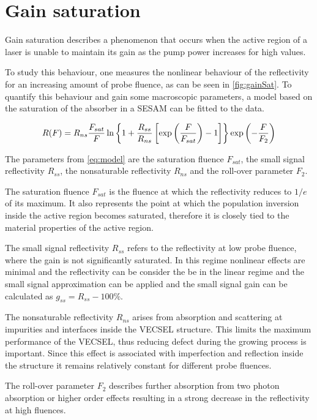 \section{Gain saturation}

Gain saturation describes a phenomenon that occurs when the active region of a laser is unable to maintain its gain as the pump power increases for high values. 

To study this behaviour, one measures the nonlinear behaviour of the reflectivity for an increasing amount of probe fluence, as can be seen in \cref{fig:gainSat}. To quantify this behaviour and gain some macroscopic parameters, a model based on the saturation of the absorber in a SESAM can be fitted to the data. 

\begin{equation}
    \centering
    R(F)=R_{ns} \frac{F_{sat}}{F} \ln\left\{1 + \frac{R_{ss}}{R_{ns}} \left[\exp{ \left(\frac{F}{F_{sat}}\right) } - 1\right]\right\} \exp{\left(-\frac{F}{F_2}\right)}
    \label{eq:model}
\end{equation}

The parameters from \cref{eq:model} are the saturation fluence $F_{sat}$, the small signal reflectivity $R_{ss}$, the nonsaturable reflectivity $R_{ns}$ and the roll-over parameter $F_{2}$.

The saturation fluence $F_{sat}$ is the fluence at which the reflectivity reduces to $1/e$ of its maximum. It also represents the point at which the population inversion inside the active region becomes saturated, therefore it is closely tied to the material properties of the active region.

The small signal reflectivity $R_{ss}$ refers to the reflectivity at low probe fluence, where the gain is not significantly saturated. In this regime nonlinear effects are minimal and the reflectivity can be consider the be in the linear regime and the small signal approximation can be applied and the small signal gain can be calculated as $g_{ss}=R_{ss}-100\%$.

The nonsaturable reflectivity $R_{ns}$ arises from absorption and scattering at impurities and interfaces inside the VECSEL structure. This limits the maximum performance of the VECSEL, thus reducing defect during the growing process is important. Since this effect is associated with imperfection and reflection inside the structure it remains relatively constant for different probe fluences. 

The roll-over parameter $F_2$ describes further absorption from two photon absorption or higher order effects resulting in a strong decrease in the reflectivity at high fluences.

